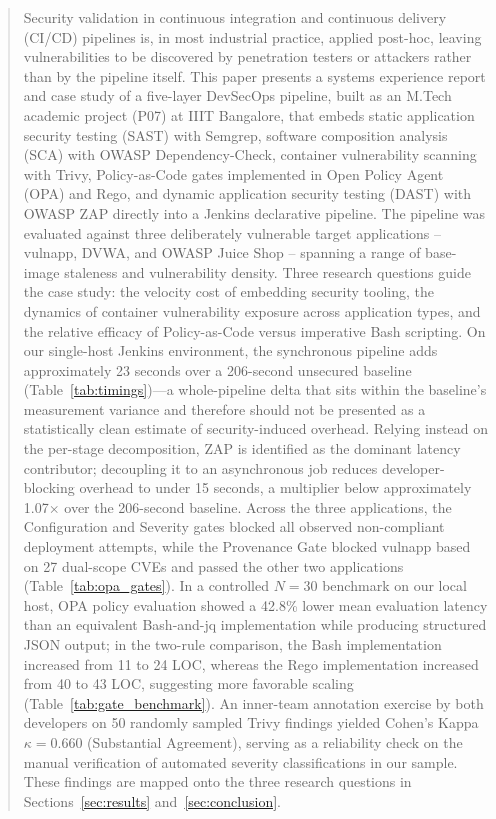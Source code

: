 \documentclass[conference]{IEEEtran}
\begin{document}
\begin{abstract}
Security validation in continuous integration and continuous delivery (CI/CD) pipelines is, in most industrial practice, applied post-hoc, leaving vulnerabilities to be discovered by penetration testers or attackers rather than by the pipeline itself. This paper presents a systems experience report and case study of a five-layer DevSecOps pipeline, built as an M.Tech academic project (P07) at IIIT Bangalore, that embeds static application security testing (SAST) with Semgrep, software composition analysis (SCA) with OWASP Dependency-Check, container vulnerability scanning with Trivy, Policy-as-Code gates implemented in Open Policy Agent (OPA) and Rego, and dynamic application security testing (DAST) with OWASP ZAP directly into a Jenkins declarative pipeline. The pipeline was evaluated against three deliberately vulnerable target applications -- vulnapp, DVWA, and OWASP Juice Shop -- spanning a range of base-image staleness and vulnerability density. Three research questions guide the case study: the velocity cost of embedding security tooling, the dynamics of container vulnerability exposure across application types, and the relative efficacy of Policy-as-Code versus imperative Bash scripting. On our single-host Jenkins environment, the synchronous pipeline adds approximately 23 seconds over a 206-second unsecured baseline (Table~\ref{tab:timings})---a whole-pipeline delta that sits within the baseline's measurement variance and therefore should not be presented as a statistically clean estimate of security-induced overhead. Relying instead on the per-stage decomposition, ZAP is identified as the dominant latency contributor; decoupling it to an asynchronous job reduces developer-blocking overhead to under 15 seconds, a multiplier below approximately 1.07$\times$ over the 206-second baseline. Across the three applications, the Configuration and Severity gates blocked all observed non-compliant deployment attempts, while the Provenance Gate blocked vulnapp based on 27 dual-scope CVEs and passed the other two applications (Table~\ref{tab:opa_gates}). In a controlled $N=30$ benchmark on our local host, OPA policy evaluation showed a 42.8\% lower mean evaluation latency than an equivalent Bash-and-jq implementation while producing structured JSON output; in the two-rule comparison, the Bash implementation increased from 11 to 24 LOC, whereas the Rego implementation increased from 40 to 43 LOC, suggesting more favorable scaling (Table~\ref{tab:gate_benchmark}). An inner-team annotation exercise by both developers on 50 randomly sampled Trivy findings yielded Cohen's Kappa $\kappa = 0.660$ (Substantial Agreement), serving as a reliability check on the manual verification of automated severity classifications in our sample. These findings are mapped onto the three research questions in Sections~\ref{sec:results} and~\ref{sec:conclusion}.
\end{abstract}
\end{document}
